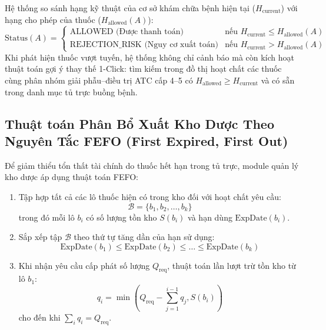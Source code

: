 Hệ thống so sánh hạng kỹ thuật của cơ sở khám chữa bệnh hiện tại ($H_{\text{current}}$) với hạng cho phép của thuốc ($H_{\text{allowed}}(A)$):
\begin{equation}
    \text{Status}(A) = \begin{cases}
    \text{ALLOWED (Được thanh toán)} & \text{nếu } H_{\text{current}} \le H_{\text{allowed}}(A) \\
    \text{REJECTION\_RISK (Nguy cơ xuất toán)} & \text{nếu } H_{\text{current}} > H_{\text{allowed}}(A)
    \end{cases}
\end{equation}
Khi phát hiện thuốc vượt tuyến, hệ thống không chỉ cảnh báo mà còn kích hoạt thuật toán gợi ý thay thế 1-Click: tìm kiếm trong đồ thị hoạt chất các thuốc cùng phân nhóm giải phẫu--điều trị ATC cấp 4--5 có $H_{\text{allowed}} \ge H_{\text{current}}$ và có sẵn trong danh mục tủ trực buồng bệnh.

\subsection{Thuật toán Phân Bổ Xuất Kho Dược Theo Nguyên Tắc FEFO (First Expired, First Out)}
\label{subsec:fefo_algorithm}

Để giảm thiểu tổn thất tài chính do thuốc hết hạn trong tủ trực, module quản lý kho dược áp dụng thuật toán FEFO:

\begin{enumerate}[leftmargin=1.5em]
    \item Tập hợp tất cả các lô thuốc hiện có trong kho đối với hoạt chất yêu cầu:
    \begin{equation}
        \mathcal{B} = \{b_1, b_2, \dots, b_k\}
    \end{equation}
    trong đó mỗi lô $b_i$ có số lượng tồn kho $S(b_i)$ và hạn dùng $\text{ExpDate}(b_i)$.
    \item Sắp xếp tập $\mathcal{B}$ theo thứ tự tăng dần của hạn sử dụng:
    \begin{equation}
        \text{ExpDate}(b_1) \le \text{ExpDate}(b_2) \le \dots \le \text{ExpDate}(b_k)
    \end{equation}
    \item Khi nhận yêu cầu cấp phát số lượng $Q_{\text{req}}$, thuật toán lần lượt trừ tồn kho từ lô $b_1$:
    \begin{equation}
        q_i = \min(Q_{\text{req}} - \sum_{j=1}^{i-1} q_j, S(b_i))
    \end{equation}
    cho đến khi $\sum_{i} q_i = Q_{\text{req}}$.
\end{enumerate}

